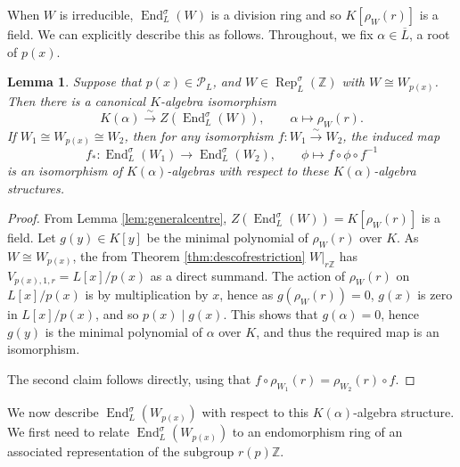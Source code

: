 \documentclass[10pt, reqno, hidelinks]{amsart}
\DeclareMathOperator{\Rep}{Rep}
\DeclareMathOperator{\End}{End}
\newcommand{\bZ}{{\mathbb Z}}
\newcommand{\sP}{{\mathcal P}}
\numberwithin{thm}{subsection}
\newtheorem{lemma}[thm]{Lemma}
\theoremstyle{definition}
\begin{document}
When $W$ is irreducible, $\End_L^{\sigma}(W)$ is a division ring and so $K[\rho_W(r)]$ is a field. We can explicitly describe this as follows. Throughout, we fix $\alpha \in \overline{L}$, a root of $p(x)$.

\begin{lemma}\label{lem:centredesc}
	Suppose that $p(x) \in \sP_L$, and $W \in \Rep_{L}^{\sigma}(\bZ)$ with $W \cong W_{p(x)}$. Then there is a canonical $K$-algebra isomorphism
	\[
	K(\alpha) \xrightarrow{\sim} Z(\End_L^{\sigma}(W)), \qquad \alpha \mapsto \rho_W(r).
	\]
	If $W_1 \cong W_{p(x)} \cong W_2$, then for any isomorphism $f \colon W_1 \xrightarrow{\sim} W_2$, the induced map
	\[
	f_* \colon \End_L^{\sigma}(W_1) \rightarrow \End_L^{\sigma}(W_2), \qquad \phi \mapsto f \circ \phi \circ f^{-1}
	\]
	is an isomorphism of $K(\alpha)$-algebras with respect to these $K(\alpha)$-algebra structures.
\end{lemma}

\begin{proof}
	From Lemma \ref{lem:generalcentre}, $Z(\End_L^{\sigma}(W)) = K[\rho_W(r)]$ is a field. Let $g(y) \in K[y]$ be the minimal polynomial of $\rho_W(r)$ over $K$. As $W \cong W_{p(x)}$, the from Theorem \ref{thm:descofrestriction} $W|_{r \bZ}$ has $V_{p(x), 1, r} = L[x] / p(x)$ as a direct summand. The action of $\rho_W(r)$ on $L[x] / p(x)$ is by multiplication by $x$, hence as $g(\rho_W(r)) = 0$, $g(x)$ is zero in $L[x] / p(x)$, and so $p(x) \mid g(x)$. This shows that $g(\alpha) = 0$, hence $g(y)$ is the minimal polynomial of $\alpha$ over $K$, and thus the required map is an isomorphism.

	The second claim follows directly, using that $f \circ \rho_{W_1}(r) = \rho_{W_2}(r) \circ f$.
\end{proof}

We now describe $\End_{L}^{\sigma}(W_{p(x)})$ with respect to this $K(\alpha)$-algebra structure. We first need to relate $\End_{L}^{\sigma}(W_{p(x)})$ to an endomorphism ring of an associated representation of the subgroup $r(p) \bZ$.
\end{document}
